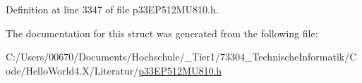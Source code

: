 Definition at line 3347 of file p33\+E\+P512\+M\+U810.\+h.



The documentation for this struct was generated from the following file\+:\begin{DoxyCompactItemize}
\item 
C\+:/\+Users/00670/\+Documents/\+Hochschule/\+\_\+\+Tier1/73304\+\_\+\+Technische\+Informatik/\+Code/\+Hello\+World4.\+X/\+Literatur/\hyperlink{p33_e_p512_m_u810_8h}{p33\+E\+P512\+M\+U810.\+h}\end{DoxyCompactItemize}
